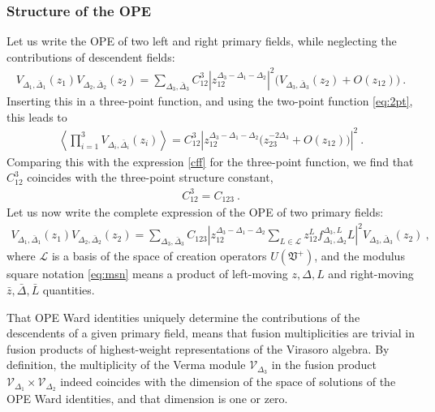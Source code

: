 \documentclass[12pt, a4paper, notitlepage, twoside]{report}
\numberwithin{equation}{section}
\theoremstyle{break}
\begin{document}
\subsubsection{Structure of the OPE}

Let us write the OPE of two left and right primary fields, while neglecting the contributions of descendent fields:
\begin{align}
 V_{\Delta_1,\bar\Delta_1}(z_1) V_{\Delta_2,\bar\Delta_2}(z_2) 
 = 
 \sum_{\Delta_3,\bar\Delta_3} C^{3}_{12}
 \left| z_{12}^{\Delta_3-\Delta_1-\Delta_2}\right|^2 \Big( V_{\Delta_3,\bar\Delta_3}(z_2) + O(z_{12})\Big)\ .
\end{align}
Inserting this in a three-point function, and using the two-point function \eqref{eq:2pt}, this leads to
\begin{align}
 \left<  \prod_{i=1}^3 V_{\Delta_i,\bar\Delta_i}(z_i) \right> 
 = 
 C^3_{12} \left| z_{12}^{\Delta_3-\Delta_1-\Delta_2} \Big( z_{23}^{-2\Delta_3} + O(z_{12}) \Big) \right|^2\ .
\end{align}
Comparing this with the expression \eqref{cff} for the three-point function, we find that $C^3_{12}$ coincides with the three-point structure constant, 
\begin{align}
 C^3_{12}= C_{123}\ .
 \label{cftt}
\end{align}
Let us now write the complete expression of the OPE of two primary fields:
\begin{align}
 \boxed{ V_{\Delta_1,\bar\Delta_1}(z_1) V_{\Delta_2,\bar\Delta_2}(z_2) 
 = 
 \sum_{\Delta_3,\bar\Delta_3} C_{123} \left| z_{12}^{\Delta_3-\Delta_1-\Delta_2}\sum_{L\in\mathcal{L}} z_{12}^Lf^{\Delta_3,L}_{\Delta_1,\Delta_2} L \right|^2 V_{\Delta_3,\bar\Delta_3}(z_2)
 }\ ,
 \label{vvs}
\end{align}
where $\mathcal{L}$ is a basis of the space of creation operators $U(\mathfrak{V}^+)$, and the modulus square notation \eqref{eq:msn} means a product of left-moving $z,\Delta,L$ and right-moving $\bar z, \bar \Delta, \bar L$ quantities.

That OPE Ward identities uniquely determine the contributions of the descendents of a given primary field, means that fusion multiplicities are trivial in fusion products of highest-weight representations of the Virasoro algebra. By definition, the multiplicity of the Verma module $\mathcal{V}_{\Delta_3}$ in the fusion product $\mathcal{V}_{\Delta_1}\times \mathcal{V}_{\Delta_2}$ indeed coincides with the dimension of the space of solutions of the OPE Ward identities, and that dimension is one or zero.
\end{document}
